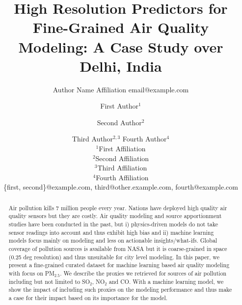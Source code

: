 \documentclass{article}
\title{High Resolution Predictors for Fine-Grained Air Quality Modeling: A Case Study over Delhi, India}
\author{
    Author Name
    \affiliations
    Affiliation
    \emails
    email@example.com
}
\author{
First Author$^1$
\and
Second Author$^2$\and
Third Author$^{2,3}$\And
Fourth Author$^4$\\
\affiliations
$^1$First Affiliation\\
$^2$Second Affiliation\\
$^3$Third Affiliation\\
$^4$Fourth Affiliation\\
\emails
\{first, second\}@example.com,
third@other.example.com,
fourth@example.com
}
\begin{document}
\maketitle

\begin{abstract}
    Air pollution kills 7 million people every year. Nations have deployed high quality air quality sensors but they are costly. Air quality modeling and source apportionment studies have been conducted in the past, but i) physics-driven models do not take sensor readings into account and thus exhibit high bias and ii) machine learning models focus mainly on modeling and less on actionable insights/what-ifs. Global coverage of pollution sources is available from NASA but it is coarse-grained in space (0.25 deg resolution) and thus unsuitable for city level modeling. In this paper, we present a fine-grained curated dataset for machine learning based air quality modeling with focus on PM$_{2.5}$. We describe the proxies we retrieved for sources of air pollution including but not limited to SO$_2$, NO$_2$ and CO. With a machine learning model, we show the impact of including such proxies on the modeling performance and thus make a case for their impact based on its importance for the model. 
\end{abstract}


\end{document}

